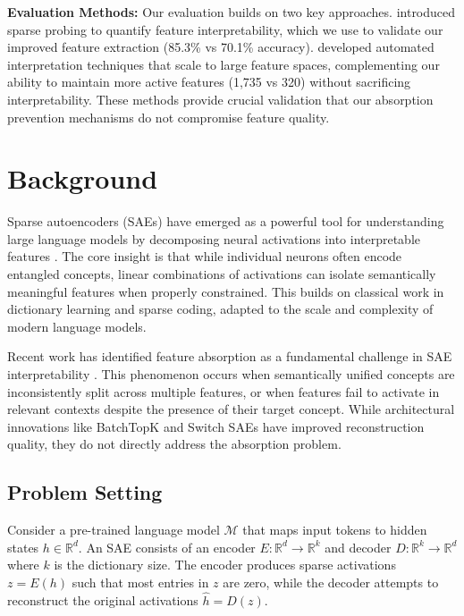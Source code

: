 \documentclass{article} %
\begin{document}
\textbf{Evaluation Methods:} Our evaluation builds on two key approaches. \cite{gurneeFindingNeuronsHaystack2023} introduced sparse probing to quantify feature interpretability, which we use to validate our improved feature extraction (85.3\% vs 70.1\% accuracy). \cite{pauloAutomaticallyInterpretingMillions2024} developed automated interpretation techniques that scale to large feature spaces, complementing our ability to maintain more active features (1,735 vs 320) without sacrificing interpretability. These methods provide crucial validation that our absorption prevention mechanisms do not compromise feature quality.

\section{Background}
\label{sec:background}

Sparse autoencoders (SAEs) have emerged as a powerful tool for understanding large language models by decomposing neural activations into interpretable features \cite{gaoScalingEvaluatingSparse}. The core insight is that while individual neurons often encode entangled concepts, linear combinations of activations can isolate semantically meaningful features when properly constrained. This builds on classical work in dictionary learning and sparse coding, adapted to the scale and complexity of modern language models.

Recent work has identified feature absorption as a fundamental challenge in SAE interpretability \cite{chaninAbsorptionStudyingFeature2024}. This phenomenon occurs when semantically unified concepts are inconsistently split across multiple features, or when features fail to activate in relevant contexts despite the presence of their target concept. While architectural innovations like BatchTopK \cite{bussmannBatchTopKSparseAutoencoders2024} and Switch SAEs \cite{mudideEfficientDictionaryLearning2024a} have improved reconstruction quality, they do not directly address the absorption problem.

\subsection{Problem Setting}
Consider a pre-trained language model $\mathcal{M}$ that maps input tokens to hidden states $h \in \mathbb{R}^d$. An SAE consists of an encoder $E: \mathbb{R}^d \to \mathbb{R}^k$ and decoder $D: \mathbb{R}^k \to \mathbb{R}^d$ where $k$ is the dictionary size. The encoder produces sparse activations $z = E(h)$ such that most entries in $z$ are zero, while the decoder attempts to reconstruct the original activations $\hat{h} = D(z)$.
\end{document}
